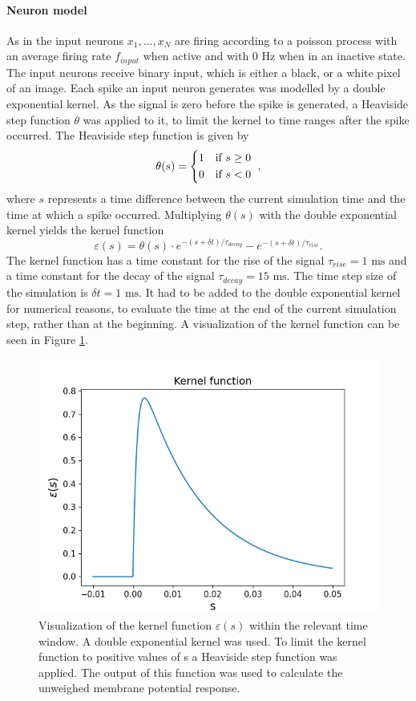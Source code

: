 \paragraph{Neuron model}
As in \citet{nessler} the input neurons $x_1,...,x_N$ are firing according to a poisson process with an average firing rate $f_{input}$ when active and with 0 Hz when in an inactive state. The input neurons receive binary input, which is either a black, or a white pixel of an image. Each spike an input neuron generates was modelled by a double exponential kernel. As the signal is zero before the spike is generated, a Heaviside step function $\theta$ was applied to it, to limit the kernel to time ranges after the spike occurred. The Heaviside step function is given by
\begin{equation}
\theta (s) = \begin{dcases*} 1 & if $s \geq 0$ \\
0 & if $s < 0 $ \end{dcases*},
\end{equation}
where $s$ represents a time difference between the current simulation time and the time at which a spike occurred.
Multiplying $\theta(s)$ with the double exponential kernel yields the kernel function 
\begin{equation}
\varepsilon (s) = \theta (s) \cdot e^{-(s + \delta t) / \tau_{decay}} - e^{-(s + \delta t) / \tau_{rise}}.
\end{equation}
The kernel function has a time constant for the rise of the signal $\tau_{rise} = 1\text{ ms}$ and a time constant for the decay of the signal $\tau_{decay} = 15\text{ ms}$. The time step size of the simulation is $\delta t = 1\text{ ms}$. It had to be added to the double exponential kernel for numerical reasons, to evaluate the time at the end of the current simulation step, rather than at the beginning. A visualization of the kernel function can be seen in Figure \ref{fig:kernelFunction}. 

\begin{figure}
  \centering
  \includegraphics[width=0.6\linewidth]{figures/kernelFunction.png}
  \caption{Visualization of the kernel function $\varepsilon (s)$ within the relevant time window. A double exponential kernel was used. To limit the kernel function to positive values of s a Heaviside step function was applied. The output of this function was used to calculate the unweighed membrane potential response. }
  \label{fig:kernelFunction}
\end{figure}

